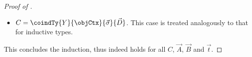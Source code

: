 \documentclass[preprint]{sigplanconf}
\begin{document}
\begin{proof}[Proof of ]
\begin{itemize}
\begin{equation*}
      g_k =
      \inMu_k
      \inst \id_{\objCtxA_k} \inst
      \left(F_{D_k}^{\tyCtx, Y}\left(
          \vec{t},\id_{R_{\vec{B}}}
        \right)\right),
    \end{equation*}
    where $\inMu_k$ refers to
    $\inMuT[Y]{\objCtx}{\vec{\sigma}}{\vec{D}
      \tySubst{\vec{\pAbstr{\objCtx_i}{B}}}{\vec{X}}}_k$
    (see the definition of $F$), then we can derive the following.
    \begin{equation*}
      \AxiomC{$
        \typed[]{\inMu_k}
        {\appCtx{\objCtxA_k}(F_{D_k}^{\tyCtx, Y}(\vec{A}, R_{\vec{B}})
          \ctxTo R_{\vec{B}} \inst \sigma_k)}$}
      \RightLabel{\Inst}
      \UnaryInfC{$
        \typed[\objCtxA_k]{\inMu_k \inst \id_{\objCtxA_k}}{
          F_{D_k}^{\tyCtx, Y}(\vec{A}, R_{\vec{B}})
          \ctxTo R_{\vec{B}} \inst \sigma_k}$}
      \RightLabel{\Inst}
      \UnaryInfC{$
        \typed[\objCtxA_k,
          x : D_k \tySubst{\vec{\pAbstr{\objCtx_i}{A}}}{
            \vec{X}} \tySubst{R_{\vec{B}}}{Y}]
        {g_k}{R_{\vec{B}}}$}
      \RightLabel{\rulelabel{Ind-E}}
      \UnaryInfC{$
        \typed{\rec \, x \, \vec{g} \inst \id_{\objCtx}}
        {R_{\vec{A}} \inst \id_{\objCtx} \ctxTo R_{\vec{B}} \inst \id_{\objCtx}}$}
      \RightLabel{\Inst}
      \UnaryInfC{$
        \typed[\objCtx, x : R_{\vec{A}} \inst \id_{\objCtx}]
        {\rec \, x \, \vec{g} \inst \id_{\objCtx} \inst x}
        {R_{\vec{B}} \inst \id_{\objCtx}}$}
      \DisplayProof
    \end{equation*}
    Finally, we have
    \begin{align*}
      \tyFunc{C}^{\tyCtx}(\vec{A})
      & = \indTy{Y}{\objCtx}{\vec{\sigma}}{\vec{D}}
        \tySubst{\vec{\pAbstr{\objCtx_i}{A}}}{\vec{X}} \inst \id_{\objCtx} \\
      & = R_{\vec{A}} \inst \id_{\objCtx},
    \end{align*}
    which implies, by the above derivitations, that we indeed have
    \begin{equation*}
      \typed[\objCtx, x : \tyFunc{C}^{\tyCtx}(\vec{A})]
      {\tyFunc{C}^{\tyCtx}(\vec{t})}
      {\tyFunc{C}^{\tyCtx}(\vec{B})}.
    \end{equation*}
  \item $C = \coindTy{Y}{\objCtx}{\vec{\sigma}}{\vec{D}}$.
    This case is treated analogously to that for inductive types.
  \end{itemize}
  This concludes the induction, thus 
  indeed holds for all $C$, $\vec{A}$, $\vec{B}$ and $\vec{t}$.
\end{proof}
\end{document}
